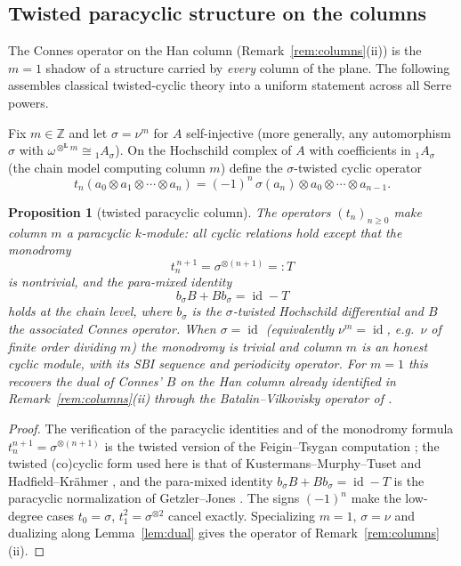 \documentclass[11pt]{amsart}
\newtheorem{proposition}[theorem]{Proposition}
\theoremstyle{definition}
\newcommand{\id}{\operatorname{id}}
\newcommand{\Lotimes}{\otimes^{\mathbf{L}}}
\newcommand{\Z}{\mathbb{Z}}
\begin{document}
\subsection{Twisted paracyclic structure on the columns}\label{subsec:paracyclic}

The Connes operator on the Han column (Remark~\ref{rem:columns}(ii)) is the
$m=1$ shadow of a structure carried by \emph{every} column of the plane. The
following assembles classical twisted-cyclic theory
\cite{FeiginTsygan,GetzlerJones,HK,KMT} into a uniform statement across all
Serre powers.

Fix $m\in\Z$ and let $\sigma=\nu^m$ for $A$ self-injective (more generally, any
automorphism $\sigma$ with $\omega^{\Lotimes m}\cong{}_1A_\sigma$). On the
Hochschild complex of $A$ with coefficients in ${}_1A_\sigma$ (the chain
model computing column $m$) define the $\sigma$-twisted cyclic operator
\[
t_n(a_0\otimes a_1\otimes\cdots\otimes a_n)
=(-1)^n\,\sigma(a_n)\otimes a_0\otimes\cdots\otimes a_{n-1}.
\]

\begin{proposition}[twisted paracyclic column]\label{prop:paracyclic}
The operators $(t_n)_{n\ge0}$ make column $m$ a \emph{paracyclic} $k$-module:
all cyclic relations hold except that the monodromy
\[
t_n^{\,n+1}=\sigma^{\otimes(n+1)}=:T
\]
is nontrivial, and the para-mixed identity
\[
b_\sigma B+Bb_\sigma=\id-T
\]
holds at the chain level, where $b_\sigma$ is the $\sigma$-twisted Hochschild
differential and $B$ the associated Connes operator. When $\sigma=\id$
(equivalently $\nu^m=\id$, e.g.\ $\nu$ of finite order dividing $m$) the
monodromy is trivial and column $m$ is an honest cyclic module, with its SBI
sequence and periodicity operator. For $m=1$ this recovers the dual of Connes'
$B$ on the Han column already identified in Remark~\ref{rem:columns}(ii) through
the Batalin--Vilkovisky operator of \cite{ArmLeb}.
\end{proposition}

\begin{proof}
The verification of the paracyclic identities and of the monodromy formula
$t_n^{n+1}=\sigma^{\otimes(n+1)}$ is the twisted version of the Feigin--Tsygan
computation \cite{FeiginTsygan}; the twisted (co)cyclic form used here is that of
Kustermans--Murphy--Tuset \cite{KMT} and Hadfield--Kr\"ahmer \cite{HK}, and the
para-mixed identity $b_\sigma B+Bb_\sigma=\id-T$ is the paracyclic normalization
of Getzler--Jones \cite{GetzlerJones}. The signs $(-1)^n$ make the low-degree
cases $t_0=\sigma$, $t_1^2=\sigma^{\otimes2}$ cancel exactly. Specializing
$m=1$, $\sigma=\nu$ and dualizing along Lemma~\ref{lem:dual} gives the operator
of Remark~\ref{rem:columns}(ii).
\end{proof}
\end{document}
